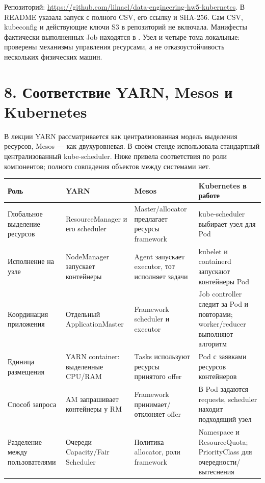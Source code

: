\documentclass[10pt,a4paper]{article}
\begin{document}
Репозиторий: \url{https://github.com/lilnacl/data-engineering-hw5-kubernetes}.
В README указала запуск с полного CSV, его ссылку и SHA-256.
Сам CSV, kubeconfig и действующие ключи S3 в репозиторий не включала.
Манифесты фактически выполненных Job находятся в .
Узел и четыре тома локальные: проверены механизмы управления ресурсами,
а не отказоустойчивость нескольких физических машин.

\clearpage
\section*{8. Соответствие YARN, Mesos и Kubernetes}
В лекции YARN рассматривается как централизованная модель выделения
ресурсов, Mesos --- как двухуровневая. В своём стенде использовала
стандартный централизованный kube-scheduler. Ниже привела соответствия
по роли компонентов; полного совпадения объектов между системами нет.

\begin{center}
\small
\begin{tabularx}{\linewidth}{>{\raggedright\arraybackslash}p{24mm}YYY}
\toprule
Роль & YARN & Mesos & Kubernetes в работе \\
\midrule
Глобальное выделение ресурсов & ResourceManager и его scheduler & Master/allocator предлагает ресурсы framework & kube-scheduler выбирает узел для Pod \\
Исполнение на узле & NodeManager запускает контейнеры & Agent запускает executor, тот исполняет задачи & kubelet и containerd запускают контейнеры Pod \\
Координация приложения & Отдельный ApplicationMaster & Framework scheduler и executor & Job controller следит за Pod и повторами; worker/reducer выполняют алгоритм \\
Единица размещения & YARN container: выделенные CPU/RAM & Tasks используют ресурсы принятого offer & Pod с заявками ресурсов контейнеров \\
Способ запроса & AM запрашивает контейнеры у RM & Framework принимает/отклоняет offer & В Pod задаются requests, scheduler находит подходящий узел \\
Разделение между пользователями & Очереди Capacity/Fair Scheduler & Политика allocator, роли framework & Namespace и ResourceQuota; PriorityClass для очередности/вытеснения \\
\bottomrule
\end{tabularx}
\end{center}
\end{document}
